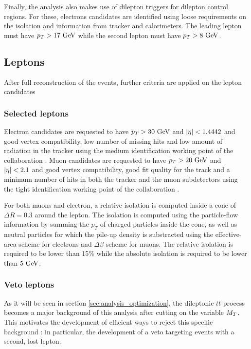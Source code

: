     Finally, the analysis also makes use of dilepton triggers for dilepton control regions. For these, electrons
    candidates are identified using loose requirements on the isolation and information from tracker and calorimeters.
    The leading lepton must have $p_T > 17 ~\text{GeV}$ while the second lepton must have $p_T > 8 ~\text{GeV}$.

        \subsection{Leptons}

        After full reconstruction of the events, further criteria are applied on the lepton candidates 

            \subsubsection{Selected leptons}

        Electron candidates are requested to have $p_T > 30 ~\text{GeV}$ and $\left| \eta \right| < 1.4442$ and good vertex compatibility,
        low number of missing hits and low amount of radiation in the tracker using the medium identification working point
        of the collaboration . Muon candidates are requested to have $p_T > 20 ~\text{GeV}$ and $\left| \eta \right| < 2.1$
        and good vertex compatibility, good fit quality for the track and a minimum number of hits in both the tracker
        and the muon subdetectors using the tight identification working point of the collaboration .

        For both muons and electron, a relative isolation is computed inside a cone of $\Delta R = 0.3$ around the lepton.
        The isolation is computed using the particle-flow information by summing the $p_T$ of charged particles inside
        the cone, as well as neutral particles for which the pile-up density is substracted using the effective-area 
        scheme for electrons and $\Delta \beta$ scheme for muons. The relative isolation is required to be lower than
        15\% while the absolute isolation is required to be lower than $5 ~\text{GeV}$.

        \subsubsection{Veto leptons \label{sec:vetoLeptons}}

        As it will be seen in section \ref{sec:analysis_optimization}, the dileptonic $t\bar{t}$ process becomes a major
        background of this analysis after cutting on the variable $M_T$. This motivates the development of efficient ways
        to reject this specific background : in particular, the development of a veto targeting events with a second, lost 
        lepton.

